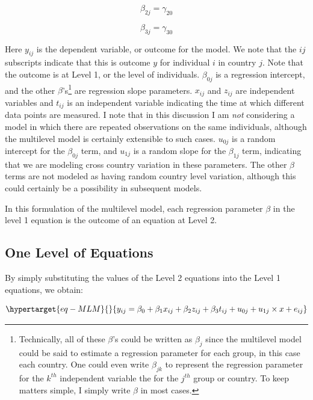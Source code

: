 \documentclass[
  letterpaper,
  DIV=11,
  numbers=noendperiod]{scrreprt}
\begin{document}
\[\beta_{2j} = \gamma_{20}\]

\[\beta_{3j} = \gamma_{30}\]

Here \(y_{ij}\) is the dependent variable, or outcome for the model. We
note that the \(ij\) subscripts indicate that this is outcome \(y\) for
individual \(i\) in country \(j\). Note that the outcome is at Level 1,
or the level of individuals. \(\beta_{0j}\) is a regression intercept,
and the other \(\beta\)'s\footnote{Technically, all of these \(\beta\)'s
  could be written as \(\beta_j\) since the multilevel model could be
  said to estimate a regression parameter for each group, in this case
  each country. One could even write \(\beta_{jk}\) to represent the
  regression parameter for the \(k^{th}\) independent variable the for
  the \(j^{th}\) group or country. To keep matters simple, I simply
  write \(\beta\) in most cases.} are regression slope parameters.
\(x_{ij}\) and \(z_{ij}\) are independent variables and \(t_{ij}\) is an
independent variable indicating the time at which different data points
are measured. I note that in this discussion I am \emph{not} considering
a model in which there are repeated observations on the same
individuals, although the multilevel model is certainly extensible to
such cases. \(u_{0j}\) is a random intercept for the \(\beta_{0j}\)
term, and \(u_{1j}\) is a random slope for the \(\beta_{1j}\) term,
indicating that we are modeling cross country variation in these
parameters. The other \(\beta\) terms are not modeled as having random
country level variation, although this could certainly be a possibility
in subsequent models.

In this formulation of the multilevel model, each regression parameter
\(\beta\) in the level 1 equation is the outcome of an equation at Level
2.

\hypertarget{one-level-of-equations}{%
\subsection{One Level of Equations}\label{one-level-of-equations}}

By simply substituting the values of the Level 2 equations into the
Level 1 equations, we obtain:

\begin{equation}\protect\hypertarget{eq-MLM}{}{y_{ij} = \beta_0 + \beta_1 x_{ij} + \beta_2 z_{ij} + \beta_3 t_{ij} + u_{0j} + u_{1j} \times x + e_{ij}}\label{eq-MLM}\end{equation}
\end{document}
